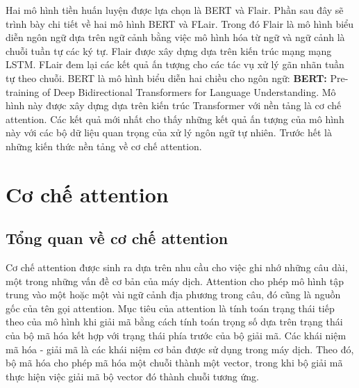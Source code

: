 \documentclass[14pt]{extreport}
\begin{document}
Hai mô hình tiền huấn luyện được lựa chọn là BERT và Flair. Phần sau đây sẽ trình bày chi tiết về hai mô hình BERT và FLair. Trong đó Flair là mô hình biểu diễn ngôn ngữ dựa trên ngữ cảnh bằng việc mô hình hóa từ ngữ và ngữ cảnh là chuỗi tuần tự các ký tự. Flair được xây dựng dựa trên kiến trúc mạng mạng LSTM. FLair đem lại các kết quả ấn tượng cho các tác vụ xử lý gãn nhãn tuần tự theo chuỗi. BERT là mô hình biểu diễn hai chiều cho ngôn ngữ: \textbf{BERT:} Pre-training of Deep Bidirectional Transformers for Language Understanding. Mô hình này được xây dựng dựa trên kiến trúc Transformer với nền tảng là cơ chế attention. Các kết quả mới nhất cho thấy những kết quả ấn tượng của mô hình này với các bộ dữ liệu quan trọng của xử lý ngôn ngữ tự nhiên. Trước hết là những kiến thức nền tảng về cơ chế attention.

\section{Cơ chế attention}
\subsection{Tổng quan về cơ chế attention}
Cơ chế attention được sinh ra dựa trên nhu cầu cho việc ghi nhớ những câu dài, một trong những vấn đề cơ bản của máy dịch. Attention cho phép mô hình tập trung vào một hoặc một vài ngữ cảnh địa phương trong câu, đó cũng là nguồn gốc của tên gọi attention. Mục tiêu của attention là tính toán trạng thái tiếp theo của mô hình khi giải mã bằng cách tính toán trọng số dựa trên trạng thái của bộ mã hóa kết hợp với trạng thái phía trước của bộ giải mã. Các khái niệm mã hóa - giải mã là các khái niệm cơ bản được sử dụng trong máy dịch. Theo đó, bộ mã hóa cho phép mã hóa một chuỗi thành một vector, trong khi bộ giải mã thực hiện việc giải mã bộ vector đó thành chuỗi tương ứng.
\end{document}
